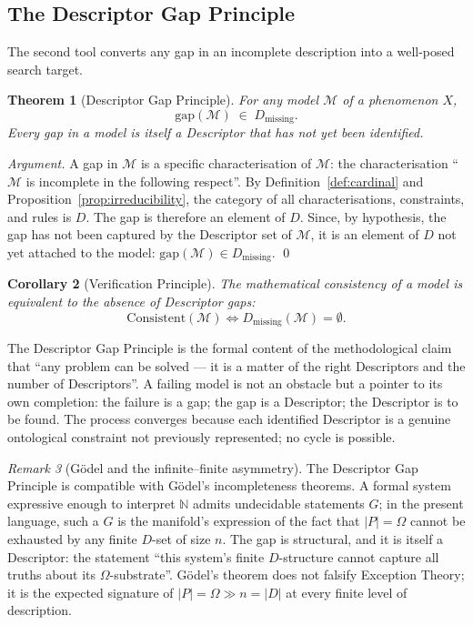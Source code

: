 \documentclass[11pt,a4paper]{article}
\newtheorem{theorem}{Theorem}[section]
\newtheorem{corollary}[theorem]{Corollary}
\theoremstyle{definition}
\theoremstyle{remark}
\newtheorem{remark}[theorem]{Remark}
\begin{document}
\subsection{The Descriptor Gap Principle}\label{subsec:descriptor-gap}

The second tool converts any gap in an incomplete description into a well-posed search target.

\begin{theorem}[Descriptor Gap Principle]\label{thm:descriptor-gap}
For any model $\mathcal{M}$ of a phenomenon $X$,
\[
\boxed{\;\mathrm{gap}(\mathcal{M}) \;\in\; D_{\mathrm{missing}}.\;}
\]
Every gap in a model is itself a Descriptor that has not yet been identified.
\end{theorem}

\begin{proof}[Argument]
A gap in $\mathcal{M}$ is a specific characterisation of $\mathcal{M}$: the characterisation ``$\mathcal{M}$ is incomplete in the following respect''. By Definition~\ref{def:cardinal} and Proposition~\ref{prop:irreducibility}, the category of all characterisations, constraints, and rules is $D$. The gap is therefore an element of $D$. Since, by hypothesis, the gap has not been captured by the Descriptor set of $\mathcal{M}$, it is an element of $D$ not yet attached to the model: $\mathrm{gap}(\mathcal{M})\in D_{\mathrm{missing}}$. \qed
\end{proof}

\begin{corollary}[Verification Principle]\label{cor:verification}
The mathematical consistency of a model is equivalent to the absence of Descriptor gaps:
\[
\mathrm{Consistent}(\mathcal{M}) \iff D_{\mathrm{missing}}(\mathcal{M}) = \emptyset.
\]
\end{corollary}

The Descriptor Gap Principle is the formal content of the methodological claim that ``any problem can be solved --- it is a matter of the right Descriptors and the number of Descriptors''. A failing model is not an obstacle but a pointer to its own completion: the failure is a gap; the gap is a Descriptor; the Descriptor is to be found. The process converges because each identified Descriptor is a genuine ontological constraint not previously represented; no cycle is possible.

\begin{remark}[Gödel and the infinite--finite asymmetry]
The Descriptor Gap Principle is compatible with Gödel's incompleteness theorems. A formal system expressive enough to interpret $\mathbb{N}$ admits undecidable statements $G$; in the present language, such a $G$ is the manifold's expression of the fact that $|P|=\Omega$ cannot be exhausted by any finite $D$-set of size $n$. The gap is structural, and it is itself a Descriptor: the statement ``this system's finite $D$-structure cannot capture all truths about its $\Omega$-substrate''. Gödel's theorem does not falsify Exception Theory; it is the expected signature of $|P|=\Omega \gg n = |D|$ at every finite level of description.
\end{remark}
\end{document}
